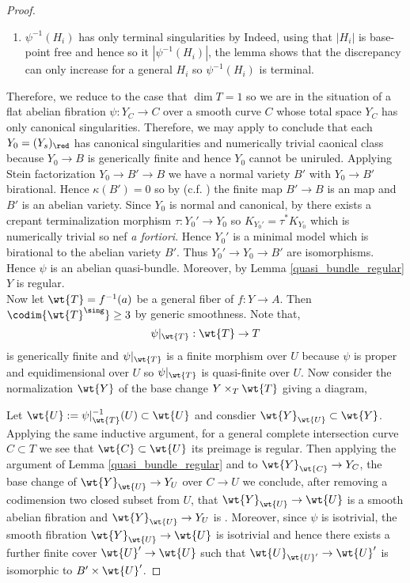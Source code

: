 \documentclass[12pt]{article}
\begin{document}
\begin{proof}
\begin{enumerate}
\item $\psi^{-1}(H_i)$ has only terminal singularities by \cite[Lemma 5.17]{kollar_mori} Indeed, using that $|H_i|$ is base-point free and hence so it $|\psi^{-1}(H_i)|$, the lemma shows that the discrepancy can only increase for a general $H_i$ so $\psi^{-1}(H_i)$ is terminal.
\end{enumerate}
Therefore, we reduce to the case that $\dim{T} = 1$ so we are in the situation of a flat abelian fibration $\psi : Y_C \to C$ over a smooth curve $C$ whose total space $Y_C$ has only canonical singularities. Therefore, we may apply \cite[Thm. 1.1]{takayama_degeneration} to conclude that each $Y_0 = (Y_s)_{\red}$ has canonical singularities and numerically trivial caonical class because $Y_0 \to B$ is generically finite and hence $Y_0$ cannot be uniruled. Applying Stein factorization $Y_0 \to B' \to B$ we have a normal variety $B'$ with $Y_0 \to B'$ birational. Hence $\kappa(B') = 0$ so by \cite{kawamata_1980} (c.f. \cite[Thm. 4]{kawamata_abelian_varieties}) the finite map $B' \to B$ is an \etale map and $B'$ is an abelian variety. Since $Y_0$ is normal and canonical, by \cite{BCHM} there exists a crepant terminalization morphism $\tau : Y_0' \to Y_0$ so $K_{Y_0'} = \tau^* K_{Y_0}$ which is numerically trivial so nef \textit{a fortiori}. Hence $Y_0'$ is a minimal model which is birational to the abelian variety $B'$. Thus $Y_0' \to Y_0 \to B'$ are isomorphisms. Hence $\psi$ is an abelian quasi-bundle. Moreover, by Lemma \ref{quasi_bundle_regular} $Y$ is regular.
\bigskip\\
Now let $\wt{T} = f^{-1}(a)$ be a general fiber of $f : Y \to A$. Then $\codim{\wt{T}^{\sing}} \ge 3$ by generic smoothness. Note that,
\[ \psi|_{\wt{T}} : \wt{T} \to T \]
is generically finite and $\psi|_{\wt{T}}$ is a finite morphism over $U$ because $\psi$ is proper and equidimensional over $U$ so $\psi|_{\wt{T}}$ is quasi-finite over $U$. Now consider the normalization $\wt{Y}$ of the base change $Y \times_T \wt{T}$ giving a diagram,
\begin{center}
\end{center}
Let $\wt{U} := \psi|_{\wt{T}}^{-1}(U) \subset \wt{U}$ and consdier $\wt{Y}_{\wt{U}} \subset \wt{Y}$. Applying the same inductive argument, for a general complete intersection curve $C \subset T$ we see that $\wt{C} \subset \wt{U}$ its preimage is regular. Then applying the argument of Lemma \ref{quasi_bundle_regular} and \cite[Lemma 5.11]{one_forms_on_threefolds} to $\wt{Y}_{\wt{C}} \to Y_C$, the base change of $\wt{Y}_{\wt{U}} \to Y_U$ over $C \to U$ we conclude, after removing a codimension two closed subset from $U$, that $\wt{Y}_{\wt{U}} \to \wt{U}$ is a smooth abelian fibration and $\wt{Y}_{\wt{U}} \to Y_U$ is \etale. Moreover, since $\psi$ is isotrivial, the smooth fibration $\wt{Y}_{\wt{U}} \to \wt{U}$ is isotrivial and hence there exists a further finite \etale cover $\wt{U}' \to \wt{U}$ such that $\wt{U}_{\wt{U}'} \to \wt{U}'$ is isomorphic to $B' \times \wt{U}'$.

\end{proof}
\end{document}
